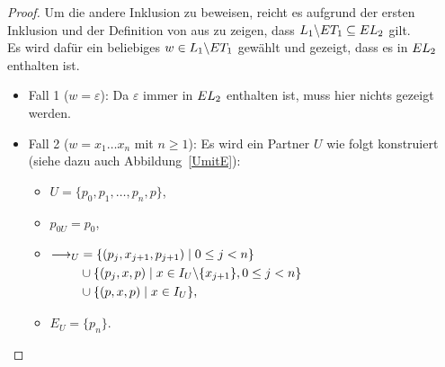 \begin{proof}
  Um die andere Inklusion zu beweisen, reicht es aufgrund der ersten
  Inklusion und der Definition von \EL{} aus zu zeigen, dass $L_1\backslash ET
  _1\subseteq EL _2$ gilt.\\
  Es wird dafür ein beliebiges $w\in L_1\backslash ET _1$ gewählt und gezeigt,
  dass es in $EL _2$ enthalten ist.
  \begin{itemize}
    \item Fall 1 ($w=\varepsilon$): Da $\varepsilon$ immer in $EL _2$
      enthalten ist, muss hier nichts gezeigt werden.
    \item Fall 2 ($w=x_1\dots x_n$ mit $n\geq 1$): Es wird ein Partner $U$ wie
      folgt konstruiert (siehe dazu auch Abbildung~\ref{UmitE}):
      \begin{itemize}
        \item $U=\{p_0,p_1,\dots ,p_n,p\}$,
        \item $p_{0U}=p_0$,
        \item $\begin{aligned}[t]
            \must _U&=\{(p_j,x_{j+1},p_{j+1})\mid 0\leq j< n\}\\
            &\cup\{(p_j,x,p)\mid x\in I_U\backslash\{x_{j+1}\},0\leq j< n\}\\
            &\cup\{(p,x,p)\mid x\in I_U\},
        \end{aligned}$
        \item $E_U=\{p_n\}$.
      \end{itemize}
      \begin{figure} [h!tbp]
      \begin{center}
\end{center}
\end{figure}
\end{itemize}
\end{proof}
